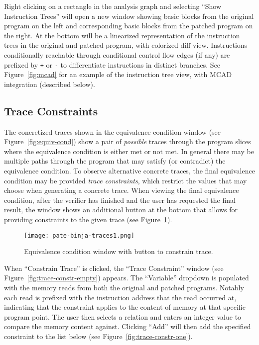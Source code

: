 Right clicking on a rectangle in the \pate{} analysis graph and selecting ``Show Instruction Trees'' will open a new window showing basic blocks from the original program on the left and corresponding basic blocks from the patched program on the right.
At the bottom will be a linearized representation of the instruction trees in the original and patched program, with colorized diff view.
Instructions conditionally reachable through conditional control flow edges (if any) are prefixed by \texttt{+} or \texttt{-} to differentiate instructions in distinct branches.
See Figure~\ref{fig:mcad} for an example of the instruction tree view, with MCAD integration (described below).

\subsection{Trace Constraints}

The concretized traces shown in the equivalence condition window (see Figure~\ref{fig:equiv-cond}) show a pair of \emph{possible} traces
through the program slices where the equivalence condition is either met or not met. In general there may be multiple paths through
the program that may satisfy (or contradict) the equivalence condition. To observe alternative concrete traces, the final equivalence
condition may be provided \emph{trace constraints}, which restrict the values that \pate{} may choose when generating a concrete trace.
When viewing the final equivalence condition, after the verifier has finished and the user has requested the final result, the window
shows an additional button at the bottom that allows for providing constraints to the given trace (see Figure~\ref{fig:equiv-cond-full}).

\begin{figure}[h]
  \centering
  \texttt{[image: pate-binja-traces1.png]}
  \caption{Equivalence condition window with button to constrain trace.}
  \label{fig:equiv-cond-full}
\end{figure}

When ``Constrain Trace'' is clicked, the ``Trace Constraint'' window (see Figure~\ref{fig:trace-constr-empty}) appears. The
``Variable'' dropdown is populated with the memory reads from both the original and patched programs. Notably each read
is prefixed with the instruction address that the read occurred at, indicating that the constraint applies to the content
of memory at that specific program point. The user then selects a relation and enters an integer value to compare the
memory content against. Clicking ``Add'' will then add the specified constraint to the list below (see Figure~\ref{fig:trace-constr-one}).


